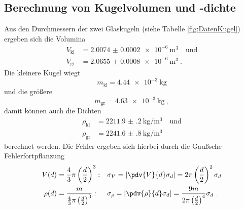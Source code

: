 \subsection{Berechnung von Kugelvolumen und -dichte}

Aus den Durchmessern der zwei Glaskugeln (siehe Tabelle \ref{fig:DatenKugel}) ergeben sich die Volumina
\begin{align}
	V_\text{kl} &= \SI{2.0074(2)e-6}{\metre\cubed} \quad \text{und} \\
	V_\text{gr} &= \SI{2.0655(8)e-6}{\metre\cubed} \ .
\end{align}
Die kleinere Kugel wiegt
\[ m_\text{kl} = \SI{4.44e-3}{\kilo\gram} \]
und die größere
\[ m_\text{gr} = \SI{4.63e-3}{\kilo\gram} \ , \]
damit können auch die Dichten
\begin{align}
	\rho_\text{kl} &= \SI{2211.9(2)}{\kilo\gram\per\metre\cubed} \quad \text{und} \\
	\rho_\text{gr} &= \SI{2241.6(8)}{\kilo\gram\per\metre\cubed}
\end{align}
berechnet werden. Die Fehler ergeben sich hierbei durch die Gaußsche Fehlerfortpflanzung
\begin{align}
	V(d) &= \frac{4}{3}\pi\left(\frac{d}{2}\right)^3: && \sigma_{V} = \left|\pdv{V}{d}\sigma_{d}\right| = 2\pi\left(\frac{d}{2}\right)^2\sigma_{d} \\
	\rho(d) &= \frac{m}{\frac{4}{3}\pi\left(\frac{d}{2}\right)^3}: && \sigma_{\rho} = \left|\pdv{\rho}{d}\sigma_{d}\right| = \frac{9m}{2\pi\left(\frac{d}{2}\right)^4}\sigma_{d} \ .
\end{align}
\clearpage


